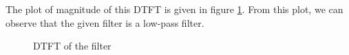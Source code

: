 \documentclass[journal,12pt,twocolumn]{IEEEtran}
\begin{document}
The plot of magnitude of this DTFT is given in figure \ref{DTFT}. From this plot, we can observe that the given filter is a low-pass filter.
\begin{figure}
    \centering
    \caption{DTFT of the filter}
    \label{DTFT}
\end{figure}
\end{document}
